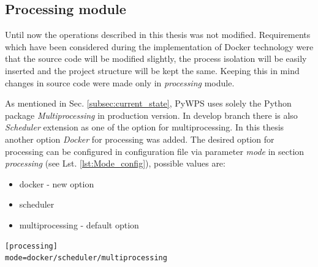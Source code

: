 \subsection{Processing module}

Until now the operations described in this thesis was not
modified. Requirements which have been considered during the
implementation of Docker technology were that the source code will
be modified slightly, the process isolation will be easily inserted and
the project structure will be kept the same. Keeping this in mind
changes in source code were made only in \textit{processing} module.

As mentioned in Sec. \ref{subsec:current_state}, PyWPS uses solely the Python package \textit{Multiprocessing} in production version.
In develop branch there is also \textit{Scheduler} extension as one of the option for multiprocessing. In this thesis another option 
\textit{Docker} for processing was added. The desired option for processing can be configured in configuration file via parameter \textit{mode} in section \textit{processing} (see Lst. \ref{lst:Mode_config}), possible values are:
\begin{itemize}
\item docker - new option
\item scheduler
\item multiprocessing - default option
\end{itemize}

\bigskip
\begin{lstlisting}[basicstyle=\small,caption={Processing mode configuration},language=XML,label={lst:Mode_config}]
[processing]
mode=docker/scheduler/multiprocessing
\end{lstlisting}

